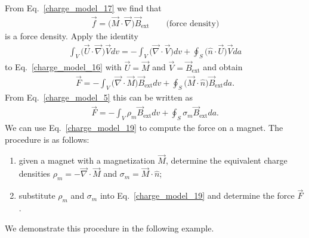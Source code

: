 \documentclass[11pt,a4paper,oneside]{book}
\numberwithin{equation}{section}
\theoremstyle{it}
\theoremstyle{definition}
\begin{document}
From Eq.~\eqref{charge_model_17} we find that 
\begin{equation}\label{charge_model_18}
	\boxed{\begin{aligned}
		\vec{f} = \Big(\vec{M}\cdot\vec{\nabla}\Big)\vec{B}_{\text{ext}}\qquad\text{(force density)}
	\end{aligned}}
\end{equation} 
is a force density. Apply the identity 
\begin{equation*}\label{}
	{\begin{aligned}
		\int_{V}\Big(\vec{U}\cdot\vec{\nabla}\Big)\vec{V}dv=-\int_{V}\Big(\vec{\nabla}\cdot\vec{V}\Big)dv+\oint_{S}\Big(\hat{n}\cdot\vec{U}\Big)\vec{V}da
	\end{aligned}}
\end{equation*} 
to Eq.~\eqref{charge_model_16} with $\vec{U}=\vec{M}$ and $\vec{V}=\vec{B}_{\text{ext}}$ and obtain
\begin{equation*}\label{}
	{\begin{aligned}
			\vec{F} =-\int_{V}\Big(\vec{\nabla}\cdot\vec{M}\Big)\vec{B}_{\text{ext}}dv + \oint_{S}\Big(\vec{M}\cdot\hat{n}\Big)\vec{B}_{\text{ext}}da.
	\end{aligned}}
\end{equation*} 
From Eq.~\eqref{charge_model_5} this can be written as
\begin{equation}\label{charge_model_19}
	\boxed{\begin{aligned}
			\vec{F} =-\int_{V}\rho_m\vec{B}_{\text{ext}}dv + \oint_{S}\sigma_m\vec{B}_{\text{ext}}da.
	\end{aligned}}
\end{equation} 
We can use Eq.~\eqref{charge_model_19} to compute the force on a magnet. The procedure is as follows:
\begin{enumerate}
	\item given a magnet with a magnetization $\vec{M}$, determine the equivalent charge densities $\rho_m=-\vec{\nabla}\cdot\vec{M}$ and $\sigma_m=\vec{M}\cdot\hat{n}$;
	\item substitute $\rho_m$ and $\sigma_m$ into Eq.~\eqref{charge_model_19} and determine the force $\vec{F}$.
\end{enumerate}
We demonstrate this procedure in the following example.
\end{document}
